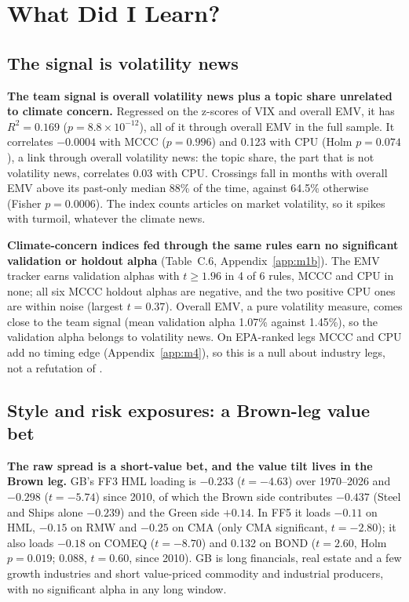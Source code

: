 \clearpage
\section{What Did I Learn?}
\label{sec:learn}

\subsection{The signal is volatility news}
\label{sec:signal}

\textbf{The team signal is overall volatility news plus a topic share unrelated to climate concern.} Regressed on the z-scores of VIX and overall EMV, it has $R^2=0.169$ ($p=8.8\times10^{-12}$), all of it through overall EMV in the full sample. It correlates $-0.0004$ with MCCC ($p=0.996$) and 0.123 with CPU (Holm $p=0.074$), a link through overall volatility news: the topic share, the part that is not volatility news, correlates 0.03 with CPU. Crossings fall in months with overall EMV above its past-only median 88\% of the time, against 64.5\% otherwise (Fisher $p=0.0006$). The index counts articles on market volatility, so it spikes with turmoil, whatever the climate news.

\textbf{Climate-concern indices fed through the same rules earn no significant validation or holdout alpha} (Table~C.6, Appendix~\ref{app:m1b}). The EMV tracker earns validation alphas with $t\ge1.96$ in 4 of 6 rules, MCCC and CPU in none; all six MCCC holdout alphas are negative, and the two positive CPU ones are within noise (largest $t=0.37$). Overall EMV, a pure volatility measure, comes close to the team signal (mean validation alpha 1.07\% against 1.45\%), so the validation alpha belongs to volatility news. On EPA-ranked legs MCCC and CPU add no timing edge (Appendix~\ref{app:m4}), so this is a null about industry legs, not a refutation of \citet{pst2022}.

\subsection{Style and risk exposures: a Brown-leg value bet}
\label{sec:exposures}

\textbf{The raw spread is a short-value bet, and the value tilt lives in the Brown leg.} GB's FF3 HML loading is $-0.233$ ($t=-4.63$) over 1970--2026 and $-0.298$ ($t=-5.74$) since 2010, of which the Brown side contributes $-0.437$ (Steel and Ships alone $-0.239$) and the Green side $+0.14$. In FF5 it loads $-0.11$ on HML, $-0.15$ on RMW and $-0.25$ on CMA (only CMA significant, $t=-2.80$); it also loads $-0.18$ on COMEQ ($t=-8.70$) and 0.132 on BOND ($t=2.60$, Holm $p=0.019$; 0.088, $t=0.60$, since 2010). GB is long financials, real estate and a few growth industries and short value-priced commodity and industrial producers, with no significant alpha in any long window.

